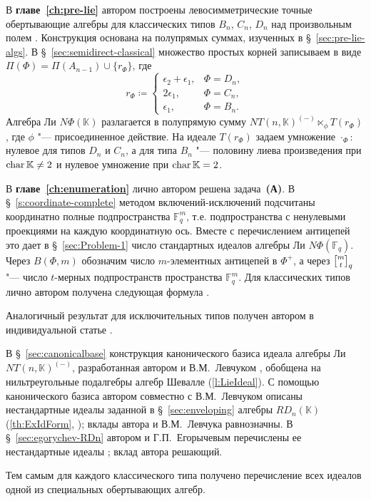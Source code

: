     В \textbf{главе~\ref{ch:pre-lie}} автором построены левосимметрические точные
    обертывающие алгебры для классических типов $B_n$, $C_n$, $D_n$ над
    произвольным полем \cite[теорема~5]{jsfu2026}. Конструкция основана на
    полупрямых суммах, изученных в \S~\ref{sec:pre-lie-algs}. В
    \S~\ref{sec:semidirect-classical} множество простых корней записываем в виде
    $\Pi(\Phi)=\Pi(A_{n-1})\cup\{r_\Phi\}$, где
    \[
        r_\Phi\coloneq
        \begin{cases}
            \epsilon_2+\epsilon_1, & \Phi=D_n, \\
            2\epsilon_1,           & \Phi=C_n, \\
            \epsilon_1,            & \Phi=B_n.
        \end{cases}
    \]
    Алгебра Ли $N\Phi(\mathbb{K})$ разлагается в полупрямую сумму
    $NT(n,\mathbb{K})^{(-)}\ltimes_\phi T(r_\Phi)$, где $\phi$ "--- присоединенное
    действие. На идеале $T(r_\Phi)$ задаем умножение $\cdot_\Phi$: нулевое для
    типов $D_n$ и $C_n$, а для типа $B_n$ "--- половину лиева произведения при
    $\operatorname{char}\mathbb{K}\neq2$ и нулевое умножение при $\operatorname{char}\mathbb{K}=2$.


    В \textbf{главе~\ref{ch:enumeration}} лично автором решена задача~\textbf{(А)}.
    В \S~\ref{s:coordinate-complete} методом включений-исключений подсчитаны
    координатно полные подпространства $\mathbb{F}_q^m$, т.\:е. подпространства с
    ненулевыми проекциями на каждую координатную ось. Вместе с перечислением
    антицепей это дает в \S~\ref{sec:Problem-1} число стандартных идеалов алгебры
    Ли $N\Phi(\mathbb{F}_q)$. Через $B(\Phi,m)$ обозначим число $m$-элементных
    антицепей в $\Phi^+$, а через $\qbinom{m}{t}$ "--- число $t$-мерных
    подпространств пространства $\mathbb{F}_q^m$. Для классических типов лично
    автором получена следующая формула \cite[теорема~1]{smj2023}.


    Аналогичный результат для исключительных типов получен автором в индивидуальной
    статье \cite[теорема~2.1]{jsfu2018}.


    В \S~\ref{sec:canonicalbase} конструкция канонического базиса идеала алгебры Ли
    $NT(n,\mathbb{K})^{(-)}$, разработанная автором и В.\:М.~Левчуком
    \cite[\S~4]{vmj2015}, обобщена на нильтреугольные подалгебры алгебр Шевалле
    (\cref{l:LieIdeal}). С помощью канонического базиса автором совместно с
    В.\:М.~Левчуком описаны нестандартные идеалы заданной в \S~\ref{sec:enveloping}
    алгебры $RD_n(\mathbb{K})$ (\cref{th:ExIdForm}, \cite[теорема~6]{smj2023});
    вклады автора и В.\:М.~Левчука равнозначны. В \S~\ref{sec:egorychev-RDn}
    автором и Г.\:П.~Егорычевым перечислены ее нестандартные идеалы
    \cite[теорема~7]{smj2023}; вклад автора решающий.


    Тем самым для каждого классического типа получено перечисление всех идеалов
    одной из специальных обертывающих алгебр.

\fi
